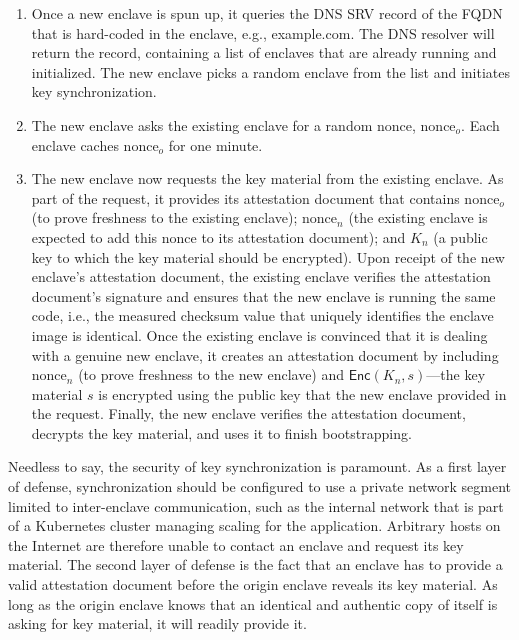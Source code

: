 \begin{enumerate}

  \item Once a new enclave is spun up, it queries the DNS SRV record of the FQDN
    that is hard-coded in the enclave, e.g., example.com.  The DNS resolver will
    return the record, containing a list of enclaves that are already running and initialized.
    The new enclave picks a random enclave from the list and initiates key
    synchronization.

  \item The new enclave asks the existing enclave for a random nonce,
    $\textrm{nonce}_o$.  Each enclave caches $\textrm{nonce}_o$ for one
    minute.

  \item The new enclave now requests the key material from the existing enclave.
    As part of the request, it provides its attestation document that contains
    $\textrm{nonce}_o$ (to prove freshness to the existing enclave);
    $\textrm{nonce}_n$ (the existing enclave is expected to add this nonce to its
    attestation document); and $K_n$ (a public key to which the key material
    should be encrypted).  Upon receipt of the new enclave's attestation
    document, the existing enclave verifies the attestation document's signature
    and ensures that the new enclave is running the same code, i.e., the measured checksum
    value that uniquely identifies the enclave image is identical.  Once the existing
    enclave is convinced that it is dealing with a genuine new enclave, it
    creates an attestation document by including $\textrm{nonce}_n$ (to prove
    freshness to the new enclave) and $\textsf{Enc}(K_n, s)$---the key material
    $s$ is encrypted using the public key that the new enclave provided in the
    request.  Finally, the new enclave verifies the attestation document,
    decrypts the key material, and uses it to finish bootstrapping.

\end{enumerate}

Needless to say, the security of key synchronization is paramount.  As a first
layer of defense, synchronization should be configured to use a private network
segment limited to inter-enclave communication, such as the internal network
that is part of a Kubernetes cluster managing scaling for the application.
Arbitrary hosts on the Internet are therefore unable to
contact an enclave and request its key material.  The second layer of defense
is the fact that an enclave has to provide a valid attestation document
before the origin enclave reveals its key material.  As long as the origin
enclave knows that an identical and authentic copy of itself is asking for key
material, it will readily provide it.

